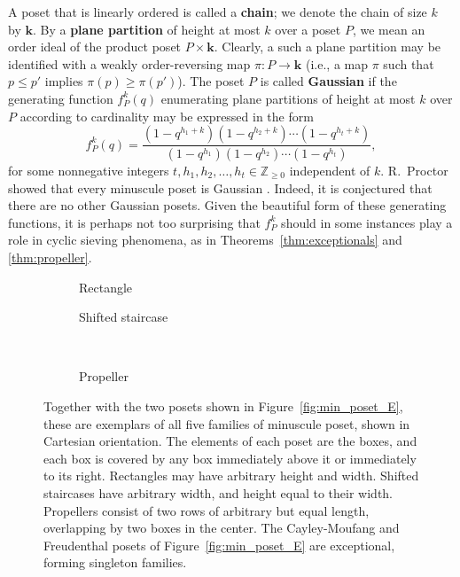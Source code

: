 \documentclass[12pt]{amsart}
\theoremstyle{definition}
\theoremstyle{remark}
\numberwithin{equation}{section}
\begin{document}
A poset that is linearly ordered is called a {\bf chain}; we denote the chain of size $k$ by $\mathbf{k}$. By a {\bf plane partition} of height at most $k$ over a poset $P$, we mean an order ideal of the product poset $P \times \mathbf{k}$.  Clearly, a such a plane partition may be identified with a weakly order-reversing map $\pi : P \to \mathbf{k}$ (i.e., a map $\pi$ such that $p \leq p'$ implies $\pi(p) \geq \pi(p')$). The poset $P$ is called {\bf Gaussian} if the generating function $f_P^k(q)$ enumerating plane partitions of height at most $k$ over $P$ according to cardinality may be expressed in the form
\[
f_P^k(q) = \frac{(1 - q^{h_1 + k})(1 - q^{h_2 + k})\cdots(1 - q^{h_t + k})}{(1 - q^{h_1})(1 - q^{h_2})\cdots(1 - q^{h_t})},
\]
for some nonnegative integers $t, h_1, h_2, \dots, h_t \in \mathbb{Z}_{\geq 0}$ independent of $k$.
R.~Proctor showed that every minuscule poset is Gaussian \cite{Proctor}. Indeed, it is conjectured that there are no other Gaussian posets. Given the beautiful form of these generating functions, it is perhaps not too surprising that $f_P^k$ should in some instances play a role in cyclic sieving phenomena, as in Theorems~\ref{thm:exceptionals} and \ref{thm:propeller}.

\begin{figure}[h]
	\begin{subfigure}[b]{0.27\textwidth}
		\centering
		\caption{Rectangle}
	\end{subfigure}
	\hspace{2cm}
	\begin{subfigure}[b]{0.27\textwidth}
		\centering
		\caption{Shifted staircase}
	\end{subfigure} \\
	\vspace{3mm}
	\begin{subfigure}[b]{0.27\textwidth}
		\centering
		\caption{Propeller}
	\end{subfigure}
\caption{Together with the two posets shown in Figure~\ref{fig:min_poset_E}, these are exemplars of all five families of minuscule poset, shown in Cartesian orientation. The elements of each poset are the boxes, and each box is covered by any box immediately above it or immediately to its right. Rectangles may have arbitrary height and width. Shifted staircases have arbitrary width, and height equal to their width. Propellers consist of two rows of arbitrary but equal length, overlapping by two boxes in the center. The Cayley-Moufang and Freudenthal posets of Figure~\ref{fig:min_poset_E} are exceptional, forming singleton families.}\label{fig:min_poset}
\end{figure}
\end{document}
